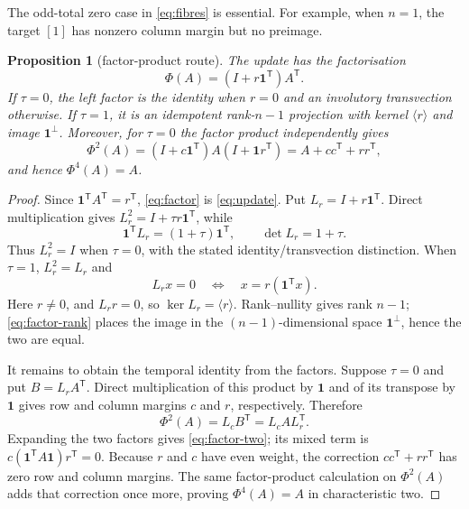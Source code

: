 \documentclass[10pt,a4paper]{amsart}
\newtheorem{proposition}[theorem]{Proposition}
\theoremstyle{definition}
\theoremstyle{remark}
\newcommand{\one}{\mathbf 1}
\begin{document}
The odd-total zero case in \eqref{eq:fibres} is essential.  For example,
when $n=1$, the target $[1]$ has nonzero column margin but no preimage.

\begin{proposition}[factor-product route]\label{prop:factor}
The update has the factorisation
\begin{equation}
 \Phi(A)=(I+r\one^{\mathsf T})A^{\mathsf T}.            \label{eq:factor}
\end{equation}
If $\tau=0$, the left factor is the identity when $r=0$ and an involutory
transvection otherwise.  If $\tau=1$, it is an idempotent rank-$n-1$
projection with kernel $\langle r\rangle$ and image $\one^\perp$.
Moreover, for $\tau=0$ the factor product independently gives
\begin{equation}
 \Phi^2(A)=(I+c\one^{\mathsf T})A
              (I+\one r^{\mathsf T})
           =A+cc^{\mathsf T}+rr^{\mathsf T},           \label{eq:factor-two}
\end{equation}
and hence $\Phi^4(A)=A$.
\end{proposition}

\begin{proof}
Since $\one^{\mathsf T}A^{\mathsf T}=r^{\mathsf T}$,
\eqref{eq:factor} is \eqref{eq:update}.  Put
$L_r=I+r\one^{\mathsf T}$.  Direct multiplication gives
$L_r^2=I+\tau r\one^{\mathsf T}$, while
\begin{equation}
 \one^{\mathsf T}L_r=(1+\tau)\one^{\mathsf T},
 \qquad \det L_r=1+\tau.                              \label{eq:factor-rank}
\end{equation}
Thus $L_r^2=I$ when $\tau=0$, with the stated identity/transvection
distinction.  When $\tau=1$, $L_r^2=L_r$ and
\[
 L_rx=0\quad\Longleftrightarrow\quad
 x=r(\one^{\mathsf T}x).
\]
Here $r\ne0$, and $L_rr=0$, so $\ker L_r=\langle r\rangle$.  Rank--nullity
gives rank $n-1$; \eqref{eq:factor-rank} places the image in the
$(n-1)$-dimensional space $\one^\perp$, hence the two are equal.

It remains to obtain the temporal identity from the factors.  Suppose
$\tau=0$ and put $B=L_rA^{\mathsf T}$.  Direct multiplication of this product
by $\one$ and of its transpose by $\one$ gives row and column margins $c$
and $r$, respectively.  Therefore
\[
 \Phi^2(A)=L_cB^{\mathsf T}=L_cAL_r^{\mathsf T}.
\]
Expanding the two factors gives \eqref{eq:factor-two}; its mixed term is
$c(\one^{\mathsf T}A\one)r^{\mathsf T}=0$.  Because $r$ and $c$ have even
weight, the correction $cc^{\mathsf T}+rr^{\mathsf T}$ has zero row and
column margins.  The same factor-product calculation on $\Phi^2(A)$ adds
that correction once more, proving $\Phi^4(A)=A$ in characteristic two.
\end{proof}
\end{document}
